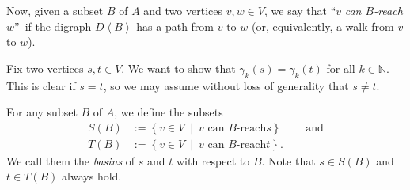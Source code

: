\documentclass[numbers=enddot,12pt,final,onecolumn,notitlepage]{scrartcl}%
\theoremstyle{definition}
\newtheorem{remk}[theo]{Remark}
\newenvironment{remark}[1][]
{\begin{remk}[#1]\begin{leftbar}}
{\end{leftbar}\end{remk}}
\theoremstyle{plainsl}
\begin{document}




Now, given a subset $B$ of $A$ and two vertices $v,w\in V$, we say that
\textquotedblleft$v$ \emph{can $B$-reach} $w$\textquotedblright\ if the
digraph $D\left\langle B\right\rangle $ has a path from $v$ to $w$ (or,
equivalently, a walk from $v$ to $w$).

Fix two vertices $s,t\in V$. We want to show that $\gamma_{k}\left(  s\right)
=\gamma_{k}\left(  t\right)  $ for all $k\in\mathbb{N}$. This is clear if
$s=t$, so we may assume without loss of generality that $s\neq t$.

For any subset $B$ of $A$, we define the subsets%
\begin{align*}
S\left(  B\right)   &  :=\left\{  v\in V\ \mid\ v\text{ can }B\text{-reach
}s\right\}  \ \ \ \ \ \ \ \ \ \ \text{and}\\
T\left(  B\right)   &  :=\left\{  v\in V\ \mid\ v\text{ can }B\text{-reach
}t\right\}  .
\end{align*}
We call them the \emph{basins} of $s$ and $t$ with respect to $B$. Note that
$s\in S\left(  B\right)  $ and $t\in T\left(  B\right)  $ always hold.
\end{document}
